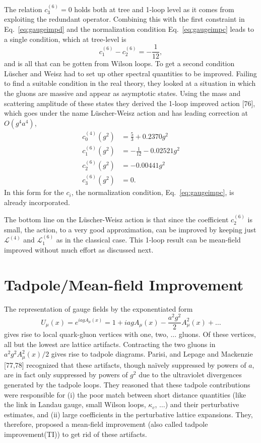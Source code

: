 The relation $c_3^{(6)} = 0$ holds both at tree and 1-loop level as it
comes from exploiting the redundant operator.  Combining this with the
first constraint in Eq.~\ref{eq:gaugeimpd} and the normalization
condition Eq.~\ref{eq:gaugeimpc} leads to a single condition, which at
tree-level is
\begin{equation}
c_1^{(6)} - c_2^{(6)} = -\frac{1}{12},
\end{equation}
and is all that can be gotten from Wilson loops.  To get a second
condition L\"uscher and Weisz had to set up other spectral quantities
to be improved.  Failing to find a suitable condition in the real
theory, they looked at a situation in which the gluons are massive and
appear as asymptotic states.  Using the mass and scattering amplitude
of these states they derived the 1-loop improved action [76], which
goes under the name L\"uscher-Weisz action and has leading correction
at $O(g^4a^4)$,
\begin{equation}
\begin{aligned}
c_0^{(4)}(g^2) &= \frac{5}{3} + 0.2370g^2\\
c_1^{(6)}(g^2) &= -\frac{1}{12} - 0.02521g^2\\
c_2^{(6)}(g^2) &= -0.00441g^2\\
c_3^{(6)}(g^2) &= 0.
\end{aligned}
\end{equation}
In this form for the $c_i$, the normalization condition,
Eq.~\ref{eq:gaugeimpc}, is already incorporated.

The bottom line on the L\"uscher-Weisz action is that since the
coefficient $c_2^{(6)}$ is small, the action, to a very good
approximation, can be improved by keeping just $\mathcal{L}^{(4)}$ and
$\mathcal{L}_1^{(6)}$ as in the classical case.  This 1-loop result
can be mean-field improved without much effort as discussed next.

\section{Tadpole/Mean-field Improvement}

The representation of gauge fields by the exponentiated form
\begin{equation}
U_\mu(x) = e^{iagA_\mu(x)} = 1 + iagA_\mu(x)
    - \frac{a^2g^2}{2}A_\mu^2(x) + \ldots
\end{equation}
gives rise to local quark-gluon vertices with one, two, $\ldots$
gluons.  Of these vertices, all but the lowest are lattice artifacts.
Contracting the two gluons in $a^2g^2A_\mu^2(x)/2$ gives rise to
tadpole diagrams.  Parisi, and Lepage and Mackenzie [77,78] recognized
that these artifacts, though na\"ively suppressed by powers of $a$, are
in fact only suppressed by powers of $g^2$ due to the ultraviolet
divergences generated by the tadpole loops.  They reasoned that these
tadpole contributions were responsible for (i) the poor match between
short distance quantities (like the link in Landau gauge, small Wilson
loops, $\kappa_c$, $\ldots$) and their perturbative estimates, and (ii)
large coefficients in the perturbative lattice expansions.  They,
therefore, proposed a mean-field improvement (also called tadpole
improvement(TI)) to get rid of these artifacts.

